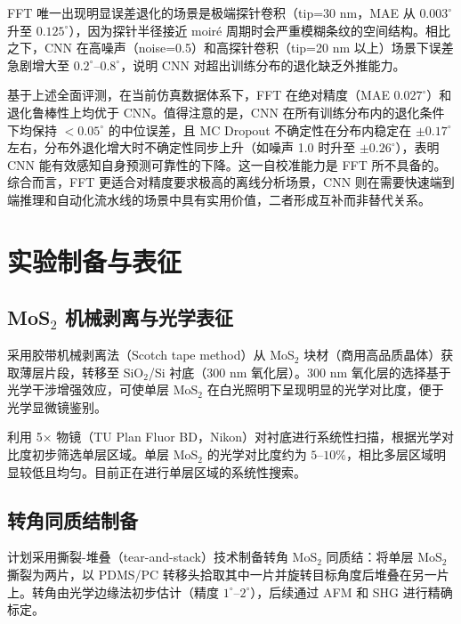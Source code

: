 \documentclass[supercite]{HustGraduPaper}
\begin{document}
FFT 唯一出现明显误差退化的场景是极端探针卷积（tip=30 nm，MAE 从 $0.003^{\circ}$ 升至 $0.125^{\circ}$），因为探针半径接近 moiré 周期时会严重模糊条纹的空间结构。相比之下，CNN 在高噪声（noise=0.5）和高探针卷积（tip=20 nm 以上）场景下误差急剧增大至 $0.2^{\circ}$--$0.8^{\circ}$，说明 CNN 对超出训练分布的退化缺乏外推能力。

基于上述全面评测，在当前仿真数据体系下，FFT 在绝对精度（MAE $0.027^{\circ}$）和退化鲁棒性上均优于 CNN。值得注意的是，CNN 在所有训练分布内的退化条件下均保持 $< 0.05^{\circ}$ 的中位误差，且 MC Dropout 不确定性在分布内稳定在 $\pm 0.17^{\circ}$ 左右，分布外退化增大时不确定性同步上升（如噪声 1.0 时升至 $\pm 0.26^{\circ}$），表明 CNN 能有效感知自身预测可靠性的下降。这一自校准能力是 FFT 所不具备的。综合而言，FFT 更适合对精度要求极高的离线分析场景，CNN 则在需要快速端到端推理和自动化流水线的场景中具有实用价值，二者形成互补而非替代关系。

\section{实验制备与表征}

\subsection{MoS$_2$ 机械剥离与光学表征}

采用胶带机械剥离法（Scotch tape method）从 MoS$_2$ 块材（商用高品质晶体）获取薄层片段，转移至 SiO$_2$/Si 衬底（300 nm 氧化层）。300 nm 氧化层的选择基于光学干涉增强效应，可使单层 MoS$_2$ 在白光照明下呈现明显的光学对比度，便于光学显微镜鉴别。

利用 5× 物镜（TU Plan Fluor BD，Nikon）对衬底进行系统性扫描，根据光学对比度初步筛选单层区域。单层 MoS$_2$ 的光学对比度约为 $5$--$10\%$，相比多层区域明显较低且均匀。目前正在进行单层区域的系统性搜索。

\subsection{转角同质结制备}


计划采用撕裂-堆叠（tear-and-stack）技术制备转角 MoS$_2$ 同质结：将单层 MoS$_2$ 撕裂为两片，以 PDMS/PC 转移头拾取其中一片并旋转目标角度后堆叠在另一片上。转角由光学边缘法初步估计（精度 $1^{\circ}$--$2^{\circ}$），后续通过 AFM 和 SHG 进行精确标定。
\end{document}
